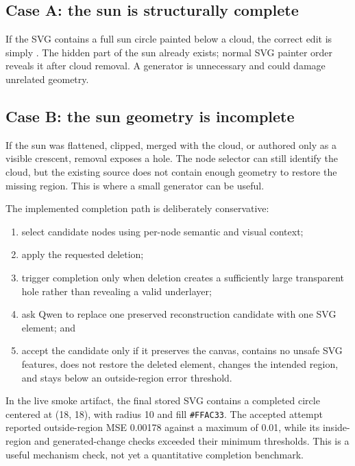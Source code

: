 \documentclass[10pt,a4paper]{article}
\newcommand{\code}[1]{\texttt{\detokenize{#1}}}
\begin{document}
\subsection{Case A: the sun is structurally complete}

If the SVG contains a full sun circle painted below a cloud, the correct edit is
simply \code{remove_element(cloud)}. The hidden part of the sun already exists;
normal SVG painter order reveals it after cloud removal. A generator is
unnecessary and could damage unrelated geometry.

\subsection{Case B: the sun geometry is incomplete}

If the sun was flattened, clipped, merged with the cloud, or authored only as a
visible crescent, removal exposes a hole. The node selector can still identify
the cloud, but the existing source does not contain enough geometry to restore
the missing region. This is where a small generator can be useful.

The implemented completion path is deliberately conservative:

\begin{enumerate}
  \item select candidate nodes using per-node semantic and visual context;
  \item apply the requested deletion;
  \item trigger completion only when deletion creates a sufficiently large
  transparent hole rather than revealing a valid underlayer;
  \item ask Qwen to replace one preserved reconstruction candidate with one SVG
  element; and
  \item accept the candidate only if it preserves the canvas, contains no unsafe
  SVG features, does not restore the deleted element, changes the intended
  region, and stays below an outside-region error threshold.
\end{enumerate}

In the live smoke artifact, the final stored SVG contains a completed circle
centered at (18, 18), with radius 10 and fill \texttt{\#FFAC33}. The accepted
attempt reported outside-region MSE 0.00178 against a maximum of 0.01, while its
inside-region and generated-change checks exceeded their minimum thresholds.
This is a useful mechanism check, not yet a quantitative completion benchmark.
\end{document}
